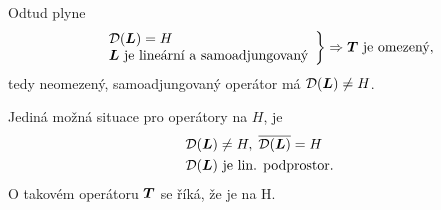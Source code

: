 Odtud plyne 
 \begin{equation*}
    \begin{split}
        \left.
    \begin{array}{ll}
        &\mathcal{D}(\boldsymbol{L})=H\\
        &\boldsymbol{L} \text{ je lineární a samoadjungovaný}
    \end{array}
        \right \} \Rightarrow \boldsymbol{T} \text{ je omezený},
    \end{split}
\end{equation*}
tedy neomezený, samoadjungovaný operátor má $\mathcal{D}(\boldsymbol{L})\neq H$.

Jediná možná situace pro  operátory na $H$, je
\begin{align*}
    &\mathcal{D}(\boldsymbol{L})\neq H,\; \overline{\mathcal{D}(\boldsymbol{L})}=H\\
    &\mathcal{D}(\boldsymbol{L}) \text{ je lin. podprostor}.
\end{align*}
O takovém operátoru $\boldsymbol{T}$ se říká, že je  na H.

